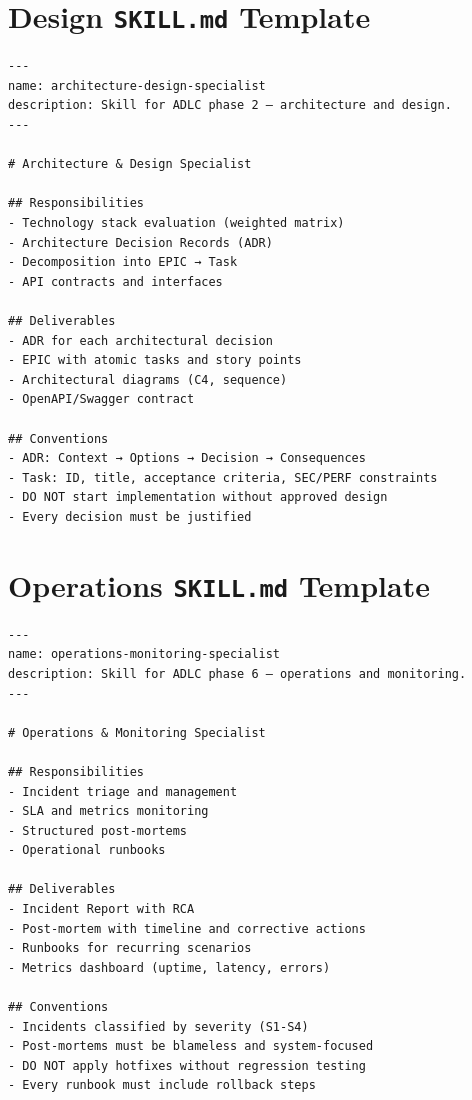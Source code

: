 \section{Design \texttt{SKILL.md} Template}

\begin{lstlisting}[language={},title={SKILL.md --- Architecture \& Design Specialist}]
---
name: architecture-design-specialist
description: Skill for ADLC phase 2 — architecture and design.
---

# Architecture & Design Specialist

## Responsibilities
- Technology stack evaluation (weighted matrix)
- Architecture Decision Records (ADR)
- Decomposition into EPIC → Task
- API contracts and interfaces

## Deliverables
- ADR for each architectural decision
- EPIC with atomic tasks and story points
- Architectural diagrams (C4, sequence)
- OpenAPI/Swagger contract

## Conventions
- ADR: Context → Options → Decision → Consequences
- Task: ID, title, acceptance criteria, SEC/PERF constraints
- DO NOT start implementation without approved design
- Every decision must be justified
\end{lstlisting}

\section{Operations \texttt{SKILL.md} Template}

\begin{lstlisting}[language={},title={SKILL.md --- Operations \& Monitoring Specialist}]
---
name: operations-monitoring-specialist
description: Skill for ADLC phase 6 — operations and monitoring.
---

# Operations & Monitoring Specialist

## Responsibilities
- Incident triage and management
- SLA and metrics monitoring
- Structured post-mortems
- Operational runbooks

## Deliverables
- Incident Report with RCA
- Post-mortem with timeline and corrective actions
- Runbooks for recurring scenarios
- Metrics dashboard (uptime, latency, errors)

## Conventions
- Incidents classified by severity (S1-S4)
- Post-mortems must be blameless and system-focused
- DO NOT apply hotfixes without regression testing
- Every runbook must include rollback steps
\end{lstlisting}

